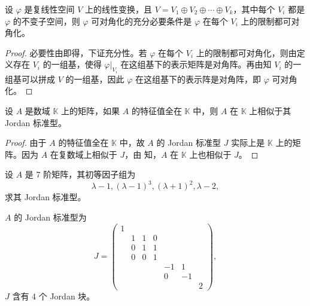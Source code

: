 \documentclass[../../main.tex]{subfiles}
\begin{document}
\begin{corollary}\label{corollary:线性变换可对角化关于在直和分解限制的充要条件}
设 $\varphi$ 是复线性空间 $V$ 上的线性变换，且 $V = V_1\oplus V_2\oplus\cdots\oplus V_k$，其中每个 $V_i$ 都是 $\varphi$ 的不变子空间，则 $\varphi$ 可对角化的充分必要条件是 $\varphi$ 在每个 $V_i$ 上的限制都可对角化。
\end{corollary}
\begin{proof}
必要性由即得，下证充分性。若 $\varphi$ 在每个 $V_i$ 上的限制都可对角化，则由定义存在 $V_i$ 的一组基，使得 $\varphi|_{V_i}$ 在这组基下的表示矩阵是对角阵。再由知 $V_i$ 的一组基可以拼成 $V$ 的一组基，因此 $\varphi$ 在这组基下的表示阵是对角阵，即 $\varphi$ 可对角化。
\end{proof}

\begin{corollary}
设 $A$ 是数域 $\mathbb{K}$ 上的矩阵，如果 $A$ 的特征值全在 $\mathbb{K}$ 中，则 $A$ 在 $\mathbb{K}$ 上相似于其 Jordan 标准型。
\end{corollary}
\begin{proof}
由于 $A$ 的特征值全在 $\mathbb{K}$ 中，故 $A$ 的 Jordan 标准型 $J$ 实际上是 $\mathbb{K}$ 上的矩阵。因为 $A$ 在复数域上相似于 $J$，由 知，$A$ 在 $\mathbb{K}$ 上也相似于 $J$。
\end{proof}

\begin{example}
设 $A$ 是 7 阶矩阵，其初等因子组为
\[
\lambda - 1, (\lambda - 1)^3, (\lambda + 1)^2, \lambda - 2,
\]
求其 Jordan 标准型。
\end{example}
\begin{solution}
$A$ 的 Jordan 标准型为
\[
J = \begin{pmatrix}
1 & & & & & & \\
& 1 & 1 & 0 & & & \\
& 0 & 1 & 1 & & & \\
& 0 & 0 & 1 & & & \\
& & & & -1 & 1 & \\
& & & & 0 & -1 & \\
& & & & & & 2
\end{pmatrix},
\]
$J$ 含有 4 个 Jordan 块。
\end{solution}
\end{document}
